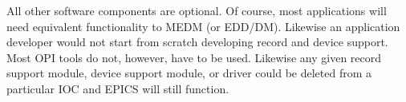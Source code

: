 All other software components are optional. Of course, most applications will need equivalent functionality to
MEDM (or EDD/DM). Likewise an application developer would not start from scratch developing record and device 
support. Most OPI tools do not, however, have to be used. Likewise any given record support module, device support 
module, or driver could be deleted from a particular IOC and EPICS will still function.

